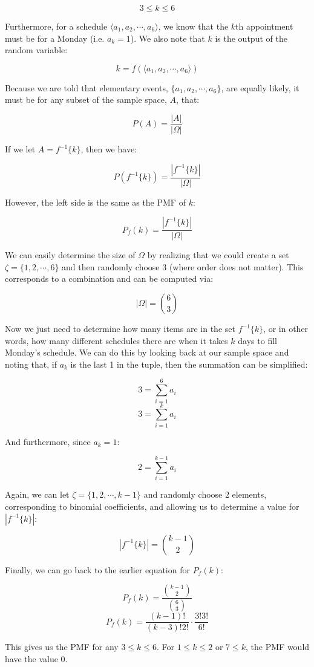 \documentclass{article}
\newcommand{\inv}[1]{#1^{-1}}
\begin{document}
\[
3\le k\le 6
\]

Furthermore, for a schedule $\langle{}a_1,a_2,\cdots,a_6\rangle$, we
know that the $k$th appointment must be for a Monday
(i.e. $a_k=1$). We also note that $k$ is the output of the random
variable:

\[
k=f(\langle a_1,a_2,\cdots,a_6\rangle)
\]

Because we are told that elementary events, $\{a_1,a_2,\cdots,a_6\}$,
are equally likely, it must be for any subset of the sample space,
$A$, that:

\[
P(A)=\frac{|A|}{|\Omega|}
\]

If we let $A=\inv{f}\{k\}$, then we have:

\[
P(\inv{f}\{k\})=\frac{|\inv{f}\{k\}|}{|\Omega|}
\]

However, the left side is the same as the PMF of $k$:

\[
P_f(k)=\frac{|\inv{f}\{k\}|}{|\Omega|}
\]

We can easily determine the size of $\Omega$ by realizing that we
could create a set $\zeta=\{1,2,\cdots,6\}$ and then randomly choose 3
(where order does not matter). This corresponds to a combination and
can be computed via:

\[
|\Omega|=\binom{6}{3}
\]

Now we just need to determine how many items are in the set
$\inv{f}\{k\}$, or in other words, how many different schedules there
are when it takes $k$ days to fill Monday's schedule. We can do this
by looking back at our sample space and noting that, if $a_k$ is the
last 1 in the tuple, then the summation can be simplified:

\[
3=\sum\limits_{i=1}^6a_i
\] \[
3=\sum\limits_{i=1}^ka_i
\]

And furthermore, since $a_k=1$:

\[
2=\sum\limits_{i=1}^{k-1}a_i
\]

Again, we can let $\zeta=\{1,2,\cdots,k-1\}$ and randomly choose 2
elements, corresponding to binomial coefficients, and allowing us to
determine a value for $|\inv{f}\{k\}|$:

\[
|\inv{f}\{k\}|=\binom{k-1}{2}
\]

Finally, we can go back to the earlier equation for $P_f(k)$:

\[
P_f(k)=\dfrac{\binom{k-1}{2}}{\binom{6}{3}}
\] \[
P_f(k)=\frac{(k-1)!}{(k-3)!2!}\cdot\frac{3!3!}{6!}
\]

This gives us the PMF for any $3\le{}k\le6$. For $1\le{}k\le2$ or
$7\le{}k$, the PMF would have the value $0$.
\end{document}
